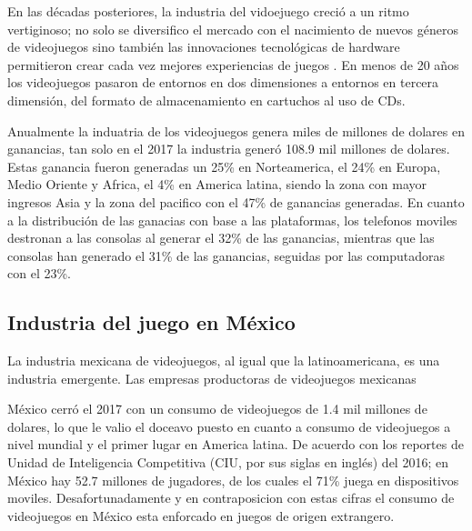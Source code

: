 En las décadas posteriores, la industria del vidoejuego creció a un ritmo 
vertiginoso; no solo se diversifico el mercado con el nacimiento de nuevos 
géneros de videojuegos sino también las innovaciones tecnológicas de hardware 
permitieron crear cada vez mejores experiencias de juegos \cite{belli2008breve}. 
En menos de 20 años los videojuegos pasaron de entornos en dos dimensiones a 
entornos en tercera dimensión, del formato de almacenamiento en cartuchos al 
uso de CDs.	
	
Anualmente la induatria de los videojuegos genera miles de millones de dolares en ganancias, tan solo en el 2017 la industria generó 108.9 mil millones de dolares\cite{Ref_JuegosGanancia}. Estas ganancia fueron generadas un 25\% en Norteamerica, el 24\% en Europa, Medio Oriente y Africa, el 4\% en America latina, siendo la zona con mayor ingresos Asia y la zona del pacifico con el 47\% de ganancias generadas. En cuanto a la distribución de las ganacias con base a las plataformas, los telefonos moviles destronan a las consolas al generar el 32\% de las ganancias, mientras que las consolas han generado el 31\% de las ganancias, seguidas por las computadoras con el 23\%\cite{Ref_JuegosGanancia}.
	\\
	\par 
	
	\subsection{Industria del juego en México}
		La industria mexicana de videojuegos, al igual que la latinoamericana, es una industria emergente. Las empresas productoras de videojuegos mexicanas 
	\\
	\par
	México cerró el 2017 con un consumo de videojuegos de 1.4 mil millones de dolares, lo que le valio el doceavo puesto en cuanto a consumo de videojuegos a nivel mundial y el primer lugar en America latina. De acuerdo con los reportes de Unidad de Inteligencia Competitiva (CIU, por sus siglas en inglés) del 2016; en México hay 52.7 millones de jugadores, de los cuales el 71\% juega en dispositivos moviles\cite{Ref_IndusMEx}. Desafortunadamente y en contraposicion con estas cifras el consumo de videojuegos en México esta enforcado en juegos de origen extrangero. 
 